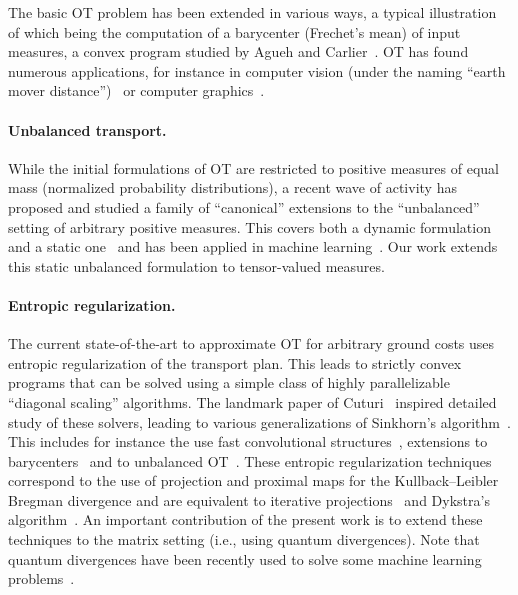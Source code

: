 The basic OT problem has been extended in various ways, a typical illustration of which being the computation of a barycenter (Frechet's mean) of input measures, a convex program studied by Agueh and Carlier~\cite{agueh-2011}.
%
OT has found numerous applications, for instance in computer vision (under the naming ``earth mover distance'')~\cite{rubner-2000} or computer graphics~\cite{bonneel-2011}. %


\paragraph{Unbalanced transport.}

While the initial formulations of OT are restricted to positive measures of equal mass (normalized probability distributions), a recent wave of activity has proposed and studied a family of ``canonical'' extensions %
to the ``unbalanced'' setting of arbitrary positive measures. This covers both a dynamic formulation~\cite{LieroMielkeSavareCourt,kondratyev2015,2016-chizat-focm} and a static one~\cite{LieroMielkeSavareLong,2015-chizat-unbalanced} and has been applied in machine learning~\cite{frogner-2015}. 
%
Our work extends this static unbalanced formulation to tensor-valued measures. 


\paragraph{Entropic regularization.}

The current state-of-the-art to approximate OT for arbitrary ground costs uses entropic regularization of the transport plan. This leads to strictly convex programs that can be solved using a simple class of highly parallelizable ``diagonal scaling'' algorithms. The landmark paper of Cuturi~\cite{cuturi-2013} inspired detailed study of these solvers, leading to various generalizations of Sinkhorn's algorithm~\cite{Sinkhorn64}. This includes for instance the use fast convolutional structures~\cite{solomon-2015}, extensions to barycenters~\cite{benamou-2015} and to unbalanced OT~\cite{frogner-2015,2016-chizat-sinkhorn}.
%
These entropic regularization techniques correspond to the use of projection and proximal maps for the Kullback--Leibler Bregman divergence and are equivalent to iterative projections~\cite{bregman-1967} and Dykstra's algorithm~\cite{Dykstra83,bauschke-lewis}. 
%
An important contribution of the present work is to extend these techniques to the matrix setting (i.e., using quantum divergences). Note that quantum divergences have been recently used to solve some machine learning problems~\cite{Dhillon2008,Kulis2009,Chandrasekaran2016}.%



